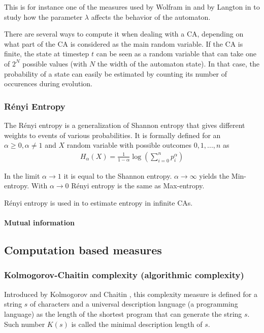 This is for instance one of the measures used by Wolfram in
\parencite{wolframStatisticalMechanicsCellular1983} and by Langton in
\parencite{langtonComputationEdgeChaos1990} to study how the parameter $\lambda$ affects
the behavior of the automaton.

There are several ways to compute it when dealing with a CA, depending on what
part of the CA is considered as the main random variable. If the CA is finite,
the state at timestep $t$ can be seen as a random variable that can take one of
$2^N$ possible values (with $N$ the width of the automaton state). In that case,
the probability of a state can easily be estimated by counting its number of
occurences during evolution.

\subsubsection{Rényi Entropy}
The Rényi entropy is a generalization of Shannon entropy that gives different
weights to events of various probabilities. It is formally defined for an
$\alpha \geq 0, \alpha \neq 1$ and $X$ random variable with possible outcomes
$0, 1, ..., n$ as
\begin{align*}
  H_\alpha(X) = \frac{1}{1-\alpha} \log\left(\sum_{i=0}^np_i^\alpha\right)
\end{align*}

In the limit $\alpha \rightarrow 1$ it is equal to the Shannon entropy. $\alpha
\rightarrow \infty$ yields the Min-entropy. With $\alpha \rightarrow 0$ Rényi
entropy is the same as Max-entropy.

Rényi entropy is used in \parencite{wolframStatisticalMechanicsCellular1983} to
estimate entropy in infinite CAs.

\paragraph{Mutual information}

\subsection{Computation based measures}

\subsubsection{Kolmogorov-Chaitin complexity {\small (algorithmic complexity)}}

Introduced by Kolmogorov \parencite{kolmogorovThreeApproachesQuantitative1968} and Chaitin
\parencite{chaitinLengthProgramsComputing1969}, this complexity measure is defined for a string $s$
of characters and a universal description language (\eg a programming language)
as the length of the shortest program that can generate the string $s$. Such
number $K(s)$ is called the minimal description length of $s$.

